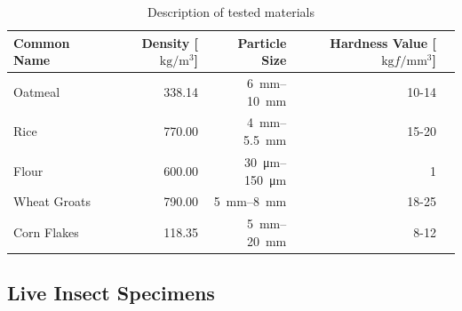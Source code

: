 \documentclass[../Vibro-Acoustic Signatures and Detection Algorithms for Stored Product Insects.tex]{subfiles}
\begin{document}
\begin{table}[!htbp]
	\caption{Description of tested materials \label{tab:materials}}
	\centering
	\small
	\begin{tabular}{@{}lrrrl@{}}
		\toprule
		\textbf{Common Name} & \textbf{Density [$\unit{\kilo\gram\per\cubic\meter}$]} & \textbf{Particle Size}                                              & \textbf{Hardness Value [$\unit{\kilo\gram f \per\milli\meter\cubed}$]}                                                                                                                   \\
		\midrule
		Oatmeal              & 338.14                                                 & \qtyrange[range-units=single,range-phrase=-]{6}{10}{\milli\meter}   & 10-14                                                                  & \cite{gatesMechanicalPropertiesOats2008}                                                                        \\
		Rice                 & 770.00                                                 & \qtyrange[range-units=single,range-phrase=-]{4}{5.5}{\milli\meter}  & 15-20                                                                  & \cite{nagatoGrainTextureRice1963}                                                                               \\
		Flour                & 600.00                                                 & \qtyrange[range-units=single,range-phrase=-]{30}{150}{\micro\meter} & 1                                                                      & \cite{glennMechanicalPropertiesStarch1992} \\
		Wheat Groats         & 790.00                                                 & \qtyrange[range-units=single,range-phrase=-]{5}{8}{\milli\meter}    & 18-25                                                                  & \cite{greerWaterAbsorptionWheat1959, morrisCollaborativeAnalysisWheat2011} \\
		Corn Flakes          & 118.35                                                 & \qtyrange[range-units=single,range-phrase=-]{5}{20}{\milli\meter}   & 8-12                                                                   & \cite{chaunierPhysicalSensoryEvaluation2005, lewickiInfluenceWaterActivity2007, ahnStudyOptimalThickness2020}   \\
		\bottomrule
	\end{tabular}
\end{table}


\subsection{Live Insect Specimens}
\end{document}
